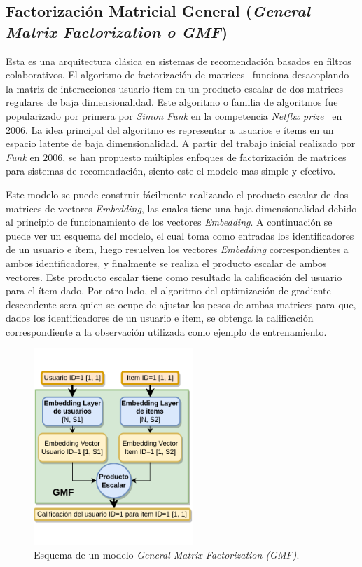\documentclass[11pt,a4paper,twoside]{thesis}
\begin{document}
\subsection{Factorización Matricial General (\textit{General Matrix Factorization o GMF})}

Esta es una arquitectura clásica en sistemas de recomendación basados en
filtros colaborativos. El algoritmo de factorización de matrices~\cite{afm}
funciona desacoplando la matriz de interacciones usuario-ítem en un producto
escalar de dos matrices regulares de baja dimensionalidad. Este algoritmo o
familia de algoritmos fue popularizado por primera por \textit{Simon Funk} en
la competencia \textit{Netflix prize}~\cite{netflixprize} en $2006$. La idea
principal del algoritmo es representar a usuarios e ítems en un espacio latente
de baja dimensionalidad. A partir del trabajo inicial realizado por
\textit{Funk} en $2006$, se han propuesto múltiples enfoques de factorización
de matrices para sistemas de recomendación, siento este el modelo mas simple y
efectivo.

Este modelo se puede construir fácilmente realizando el producto escalar de dos
matrices de vectores \textit{Embedding}, las cuales tiene una baja
dimensionalidad debido al principio de funcionamiento de los vectores
\textit{Embedding}. A continuación se puede ver un esquema del modelo, el cual
toma como entradas los identificadores de un usuario e ítem, luego resuelven
los vectores \textit{Embedding} correspondientes a ambos identificadores, y
finalmente se realiza el producto escalar de ambos vectores. Este producto
escalar tiene como resultado la calificación del usuario para el ítem dado. Por
otro lado, el algoritmo del optimización de gradiente descendente sera quien se
ocupe de ajustar los pesos de ambas matrices para que, dados los
identificadores de un usuario e ítem, se obtenga la calificación
correspondiente a la observación utilizada como ejemplo de entrenamiento.

\begin{figure}[h!]
	\centering
	\includegraphics[width=6cm]{./images/GMF.png}
	\caption{
		Esquema de un modelo \textit{General Matrix Factorization (GMF)}.
	}
	\label{fig:GMFModel}
\end{figure}
\end{document}
